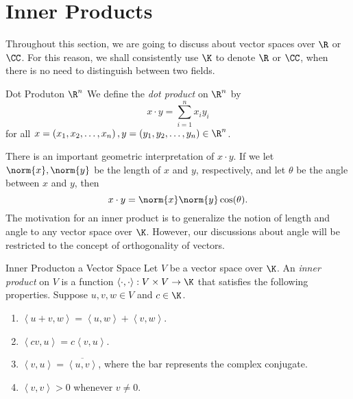 \documentclass[linearalgebraII]{subfiles}
\begin{document}

    \section{Inner Products}
    
    \begin{remark}
        Throughout this section, we are going to discuss about vector spaces over $\R$ or $\CC$. For this reason, we shall consistently use $\K$ to denote $\R$ or $\CC$, when there is no need to distinguish between two fields.
    \end{remark}

    \begin{recall}{Dot Produt}{on $\R^n$}
        We define the \emph{dot product} on $\R^n$ by
        \begin{equation*}
            x\cdot y = \sum^{n}_{i=1} x_iy_i
        \end{equation*}
        for all $x = \left( x_1,x_2,\ldots,x_n \right), y = \left( y_1,y_2,\ldots,y_n \right)\in\R^n$.
    \end{recall}

    \begin{remark}
        There is an important geometric interpretation of $x\cdot y$. If we let $\norm{x}, \norm{y}$ be the length of $x$ and $y$, respectively, and let $\theta$ be the angle between $x$ and $y$, then
        \begin{equation*}
            x\cdot y = \norm{x}\norm{y}\cos(\theta).
        \end{equation*}
        The motivation for an inner product is to generalize the notion of length and angle to any vector space over $\K$. However, our discussions about angle will be restricted to the concept of orthogonality of vectors.
    \end{remark}

    \begin{definition}{Inner Product}{on a Vector Space}
        Let $V$ be a vector space over $\K$. An \emph{inner product} on $V$ is a function $\left\langle \cdot, \cdot\right\rangle : V\times V\to \K$ that satisfies the following properties. Suppose $u,v,w\in V$ and $c\in\K$. 
        \begin{enumerate}
            \item $\left\langle u+v, w\right\rangle = \left\langle u, w\right\rangle  + \left\langle v, w\right\rangle $. 
            \item $\left\langle cv, u\right\rangle  = c\left\langle v, u\right\rangle $.
            \item $\left\langle v, u\right\rangle  = \overline{\left\langle u, v\right\rangle }$, where the bar represents the complex conjugate.
            \item $\left\langle v, v\right\rangle  > 0$ whenever $v\neq 0$.
        \end{enumerate}
    \end{definition}
\end{document}
